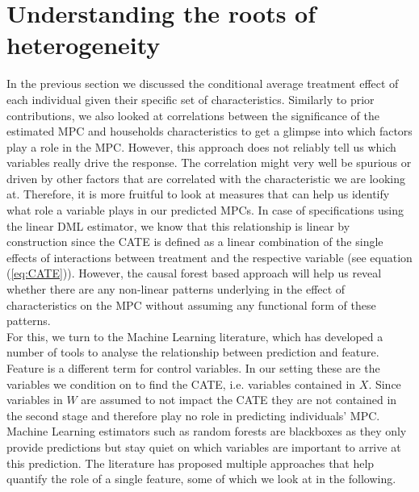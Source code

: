 \section{Understanding the roots of heterogeneity} \label{sec:roots_of_heterogeneity}
In the previous section we discussed the conditional average treatment effect of each individual given their specific set of characteristics. Similarly to prior contributions, we also looked at correlations between the significance of the estimated MPC and households characteristics to get a glimpse into which factors play a role in the MPC. However, this approach does not reliably tell us which variables really drive the response. The correlation might very well be spurious or driven by other factors that are correlated with the characteristic we are looking at. Therefore, it is more fruitful to look at measures that can help us identify what role a variable plays in our predicted MPCs. In case of specifications using the linear DML estimator, we know that this relationship is linear by construction since the CATE is defined as a linear combination of the single effects of interactions between treatment and the respective variable (see equation (\ref{eq:CATE})). However, the causal forest based approach will help us reveal whether there are any non-linear patterns underlying in the effect of characteristics on the MPC without assuming any functional form of these patterns. \\
For this, we turn to the Machine Learning literature, which has developed a number of tools to analyse the relationship between prediction and feature. Feature is a different term for control variables. In our setting these are the variables we condition on to find the CATE, i.e. variables contained in $X$. Since variables in $W$ are assumed to not impact the CATE they are not contained in the second stage and therefore play no role in predicting individuals' MPC. Machine Learning estimators such as random forests are blackboxes as they only provide predictions but stay quiet on which variables are important to arrive at this prediction. The literature has proposed multiple approaches that help quantify the role of a single feature, some of which we look at in the following. 

